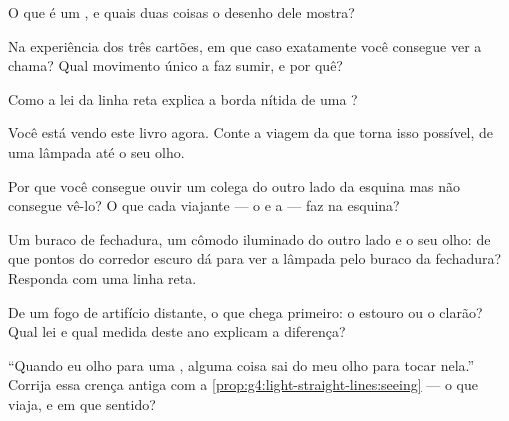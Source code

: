 \begin{exercise}[$\star$]\label{exo:g4:light-straight-lines:2}
O que é um , e quais duas coisas o desenho dele mostra?
\end{exercise}

\begin{exercise}[$\star$]\label{exo:g4:light-straight-lines:3}
Na experiência dos três cartões, em que caso exatamente você
consegue ver a chama? Qual movimento único a faz sumir, e por quê?
\end{exercise}

\begin{exercise}[$\star$]\label{exo:g4:light-straight-lines:4}
Como a lei da linha reta explica a borda nítida de uma ?
\end{exercise}

\begin{exercise}[$\star$]\label{exo:g4:light-straight-lines:5}
Você está vendo este livro agora. Conte a viagem da  que torna
isso possível, de uma lâmpada até o seu olho.
\end{exercise}

\begin{exercise}[$\star$]\label{exo:g4:light-straight-lines:6}
Por que você consegue ouvir um colega do outro lado da esquina mas
não consegue vê-lo? O que cada viajante --- o  e a  --- faz na
esquina?
\end{exercise}

\begin{exercise}[$\star$]\label{exo:g4:light-straight-lines:7}
Um buraco de fechadura, um cômodo iluminado do outro lado e o seu
olho: de que pontos do corredor escuro dá para ver a lâmpada pelo
buraco da fechadura? Responda com uma linha reta.
\end{exercise}

\begin{exercise}[$\star$]\label{exo:g4:light-straight-lines:8}
De um fogo de artifício distante, o que chega primeiro: o estouro ou
o clarão? Qual lei e qual medida deste ano explicam a diferença?
\end{exercise}

\begin{exercise}[$\star$]\label{exo:g4:light-straight-lines:9}
``Quando eu olho para uma , alguma coisa sai do meu olho para
tocar nela.'' Corrija essa crença antiga com a
\cref{prop:g4:light-straight-lines:seeing} --- o que viaja, e em que
sentido?
\end{exercise}


